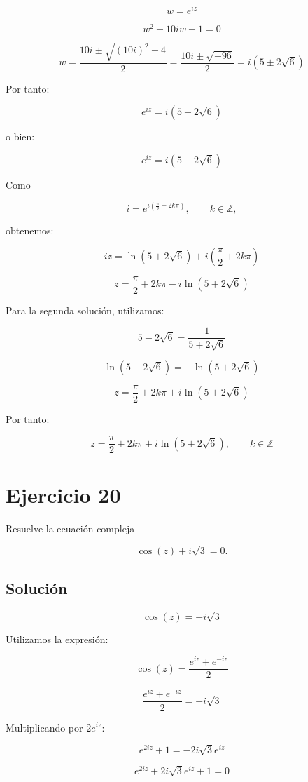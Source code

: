 \documentclass[fleqn]{article}
\begin{document}
		\[
		w=e^{iz}
		\]

		\[
		w^2-10iw-1=0
		\]

		\[
		w
		=
		\frac{10i\pm\sqrt{(10i)^2+4}}{2}
		=
		\frac{10i\pm\sqrt{-96}}{2}
		=
		i(5\pm2\sqrt{6})
		\]

		Por tanto:

		\[
		e^{iz}=i(5+2\sqrt{6})
		\]

		o bien:

		\[
		e^{iz}=i(5-2\sqrt{6})
		\]

		Como

		\[
		i=e^{i\left(\frac{\pi}{2}+2k\pi\right)},
		\qquad k\in\mathbb{Z},
		\]

		obtenemos:

		\[
		iz
		=
		\ln(5+2\sqrt{6})
		+
		i\left(\frac{\pi}{2}+2k\pi\right)
		\]

		\[
		z
		=
		\frac{\pi}{2}+2k\pi
		-i\ln(5+2\sqrt{6})
		\]

		Para la segunda solución, utilizamos:

		\[
		5-2\sqrt{6}
		=
		\frac{1}{5+2\sqrt{6}}
		\]

		\[
		\ln(5-2\sqrt{6})
		=
		-\ln(5+2\sqrt{6})
		\]

		\[
		z
		=
		\frac{\pi}{2}+2k\pi
		+i\ln(5+2\sqrt{6})
		\]

		Por tanto:

		\[
		\boxed{
		z
		=
		\frac{\pi}{2}+2k\pi
		\pm i\ln(5+2\sqrt{6}),
		\qquad k\in\mathbb{Z}
		}
		\]

	\section{Ejercicio 20}
		Resuelve la ecuación compleja

		\[
		\cos(z)+i\sqrt{3}=0.
		\]

		\subsection{Solución}

		\[
		\cos(z)=-i\sqrt{3}
		\]

		Utilizamos la expresión:

		\[
		\cos(z)=\frac{e^{iz}+e^{-iz}}{2}
		\]

		\[
		\frac{e^{iz}+e^{-iz}}{2}=-i\sqrt{3}
		\]

		Multiplicando por $2e^{iz}$:

		\[
		e^{2iz}+1=-2i\sqrt{3}e^{iz}
		\]

		\[
		e^{2iz}+2i\sqrt{3}e^{iz}+1=0
		\]
\end{document}
